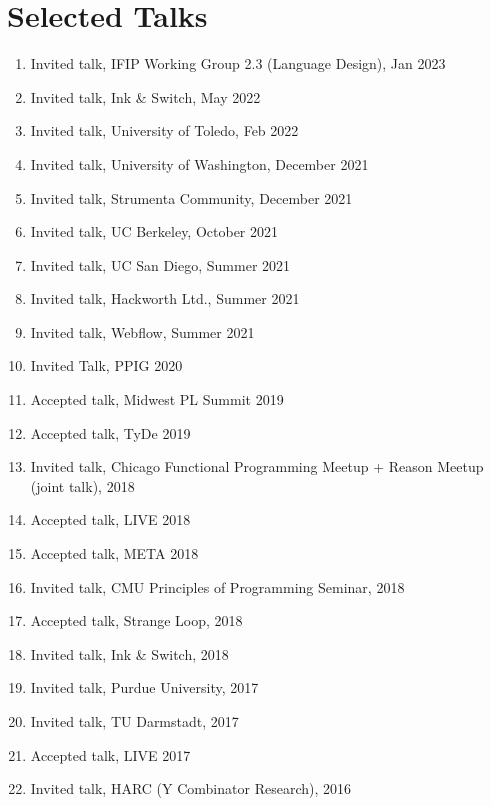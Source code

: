 \documentclass[10pt,letterpaper]{article}
\renewenvironment{itemize}{
  \begin{list}{}{
    \setlength{\leftmargin}{1.25em}
    \setlength{\itemsep}{0.25em}
    \setlength{\parskip}{0pt}
    \setlength{\parsep}{0.2em}
  }
}{
  \end{list}
}
\begin{document}
\section*{Selected Talks}
\begin{enumerate}
  \item Invited talk, IFIP Working Group 2.3 (Language Design), Jan 2023
  \item Invited talk, Ink \& Switch, May 2022
  \item Invited talk, University of Toledo, Feb 2022
  \item Invited talk, University of Washington, December 2021
  \item Invited talk, Strumenta Community, December 2021
  \item Invited talk, UC Berkeley, October 2021
  \item Invited talk, UC San Diego, Summer 2021
  \item Invited talk, Hackworth Ltd., Summer 2021
  \item Invited talk, Webflow, Summer 2021
  \item Invited Talk, PPIG 2020
  \item Accepted talk, Midwest PL Summit 2019
  \item Accepted talk, TyDe 2019
  \item Invited talk, Chicago Functional Programming Meetup + Reason Meetup (joint talk), 2018
  \item Accepted talk, LIVE 2018
  \item Accepted talk, META 2018
  \item Invited talk, CMU Principles of Programming Seminar, 2018
  \item Accepted talk, Strange Loop, 2018
  \item Invited talk, Ink \& Switch, 2018
  \item Invited talk, Purdue University, 2017
  \item Invited talk, TU Darmstadt, 2017
  \item Accepted talk, LIVE 2017
  \item Invited talk, HARC (Y Combinator Research), 2016

\end{enumerate}
\end{document}
